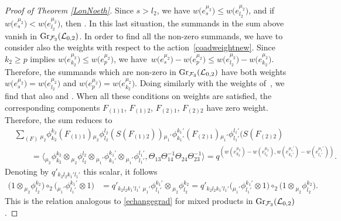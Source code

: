 \documentclass[pdftex]{sigma}
\numberwithin{equation}{section}
\theoremstyle{definition}
\newcommand{\Ll}{{\mathcal L}}
\begin{document}
\begin{proof}[Proof of Theorem \ref{LonNoeth}]
Since $s>l_2$, we have $w\big(e_{s}^{\mu_2}\big)\leq w\big(e_{l_2}^{\mu_2}\big)$, and if $w\big(e_{s}^{\mu_2}\big) < w\big(e_{l_2}^{\mu_2}\big)$, then . In this last situation, the summands  in the sum above vanish in ${\rm Gr}_{\mathcal{F}_3}(\Ll_{0,2})$. In order to find all the non-zero summands, we have to consider also the weights with respect to the action~\eqref{coadweightnew}. Since $k_2\geq p$ implies $w\big(e_{k_2}^{\mu_2}\big)\leq w\big(e_{p}^{\mu_2}\big)$, we have~${w\big(e_{s}^{\mu_2}\big)-w\big(e_{p}^{\mu_2}\big) \leq w\big(e_{l_2}^{\mu_2}\big)-w\big(e_{k_2}^{\mu_2}\big)}$. Therefore, the summands which are non-zero in ${{\rm Gr}_{\mathcal{F}_3}(\Ll_{0,2})}$ have both weights $w\big(e_{s}^{\mu_2}\big) = w\big(e_{l_2}^{\mu_2}\big)$ and $w\big(e_{p}^{\mu_2}\big) = w\big(e_{k_2}^{\mu_2}\big)$. Doing similarly with the weights of~, we find that also  and . When all these conditions on weights are satisfied, the corresponding components $F_{(1)1}$, $F_{(1)2}$, $F_{(2)1}$, $F_{(2)2}$ have zero weight. Therefore, the sum reduces to
\begin{align*}
&\sum_{(F)} {}_{{\mu_2}}\phi_{k_2}^{k_2}(F_{(1)1}){}_{{\mu_2}}\phi_{l_2}^{l_2}(S(F_{(1)2})){}_{{\mu_1'}}\phi_{k_1'}^{k_1'}(F_{(2)1}){}_{{\mu_1'}}\phi_{l_1'}^{l_1'}(S(F_{(2)2}) \\ & \qquad =\big\langle {}_{{\mu_2}}\phi_{k_2}^{k_2}\otimes {}_{{\mu_2}}\phi_{l_2}^{l_2}\otimes {}_{{\mu_1'}}\phi_{k_1'}^{k_1'}\otimes {}_{{\mu_1'}}\phi_{l_1'}^{l_1'}, \Theta_{13}\Theta_{14}^{-1}\Theta_{24}\Theta_{23}^{-1}\big\rangle = q^{(w(e_{k_2}^{\mu_2})-w(e_{l_2}^{\mu_2}), w(e_{k_1'}^{\mu_1'}) - w(e_{l_1'}^{\mu_1'}) )}.
\end{align*}
Denoting by $q'_{k_2l_2k_1'l_1'}$ this scalar, it follows
\begin{align*}
\big(1 \otimes {}_{{\mu_2}}\phi^{k_2}_{l_2}\big) \circ_2 \big({}_{{\mu_1'}}\phi^{k_1'}_{l_1'} \otimes 1\big) & = q'_{k_2l_2k_1'l_1'} \ {}_{{\mu_1'}}\phi^{k_1'}_{l_1'} \otimes {}_{{\mu_2}}\phi^{k_2}_{l_2} = q'_{k_2l_2k_1'l_1'} \big({}_{{\mu_1'}}\phi^{k_1'}_{l_1'} \otimes 1\big)\circ_2 \big(1 \otimes {}_{{\mu_2}}\phi^{k_2}_{l_2}\big).
\end{align*}
This is the relation analogous to \eqref{echangegrad} for mixed products in ${\rm Gr}_{\mathcal{F}_3}(\Ll_{0,2})$.


\end{proof}
\end{document}
